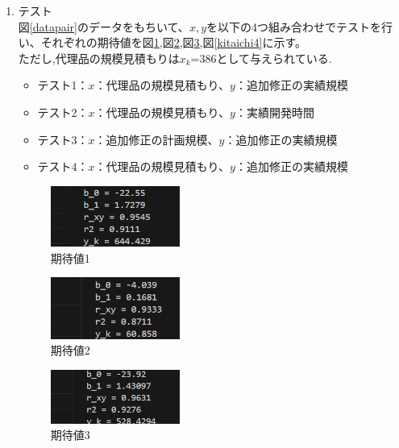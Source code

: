 \documentclass[titlepage,a4paper,12pt]{ltjsreport}
\begin{document}
\begin{enumerate}
\begin{itemize}
    \end{itemize}


    \item テスト\mbox{}\\
    図\ref{datapair}のデータをもちいて、$x,y$を以下の4つ組み合わせでテストを行い、それぞれの期待値を図\ref{kitaichi1},図\ref{kitaichi2},図\ref{kitaichi3},図\ref{kitaichi4}に示す。\\
    ただし,代理品の規模見積もりは$x_k$=386として与えられている.

    \begin{itemize}
        \item テスト1：$x$：代理品の規模見積もり、$y$：追加修正の実績規模
        \item テスト2：$x$：代理品の規模見積もり、$y$：実績開発時間
        \item テスト3：$x$：追加修正の計画規模、$y$：追加修正の実績規模
        \item テスト4：$x$：代理品の規模見積もり、$y$：追加修正の実績規模
    \end{itemize}

    \begin{figure}[h]
        \centering
        \includegraphics[width=0.4\textwidth]{../picture/課題3/out_example.png}
        \caption{期待値1}
        \label{kitaichi1}
    \end{figure}
    
    \begin{figure}[h]
        \centering
        \includegraphics[width=0.4\textwidth]{../picture/課題3/kitaichi2.png}
        \caption{期待値2}
        \label{kitaichi2}
    \end{figure}

    \begin{figure}[h]
        \centering
        \includegraphics[width=0.4\textwidth]{../picture/課題3/kitaichi3.png}
        \caption{期待値3}
        \label{kitaichi3}
    \end{figure}
    

\end{enumerate}
\end{document}
